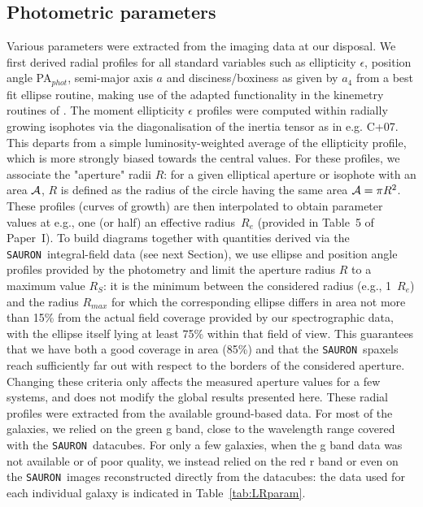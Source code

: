 \documentclass[useAMS,usenatbib,usegraphicx]{mn2e}
\newcommand{\Sauron}{\texttt{SAURON}}
\begin{document}
\subsection{Photometric parameters}
\label{sec:photo}
Various parameters were extracted from the imaging data at our disposal.
We first derived radial profiles for all standard variables such as ellipticity
$\epsilon$, position angle PA$_{phot}$, semi-major axis $a$ and disciness/boxiness 
as given by $a_4$ from a best fit ellipse routine, making use of the adapted functionality in the kinemetry
routines of \cite{Krajnovic+06}. The moment ellipticity $\epsilon$ 
profiles were computed within radially growing
isophotes via the diagonalisation of the inertia tensor as in e.g. C+07.
This departs from a simple luminosity-weighted average of the ellipticity
profile, which is more strongly biased towards the central values.
For these profiles, we associate the "aperture" radii $R$: for a given
elliptical aperture or isophote with an area $\cal A$, $R$ is defined as the radius of 
the circle having the same area ${\cal A} =\pi {R}^2$. 
These profiles (curves of growth) are then interpolated 
to obtain parameter values at e.g., one (or half) an effective radius~$R_e$
(provided in Table~5 of Paper~I).
To build diagrams together with quantities derived via the \Sauron\
integral-field data (see next Section), we use ellipse and position angle
profiles provided by the photometry and limit the aperture radius $R$ to a
maximum value $R_S$: it is the minimum between the considered radius (e.g., 1~$R_e$) and the radius
$R_{max}$ for which the corresponding ellipse differs in area not more than 15\% from the actual field coverage 
provided by our spectrographic data, with the ellipse itself lying at least 75\% within that field of view. This guarantees that we have both a good coverage in area (85\%) and that the \Sauron\ spaxels reach sufficiently far out with respect to the borders of the considered aperture. Changing these criteria only affects the measured aperture values for a few systems, and does not modify the global results presented here.
These radial profiles were extracted from the available ground-based data. For
most of the galaxies, we relied on the green g band, close to the wavelength
range covered with the \Sauron\ datacubes. For only a few galaxies, when the g band data was not
available or of poor quality, we instead relied on the red r band or even on the \Sauron\ images 
reconstructed directly from the datacubes: the data used for each individual
galaxy is indicated in Table~\ref{tab:LRparam}.
\end{document}
